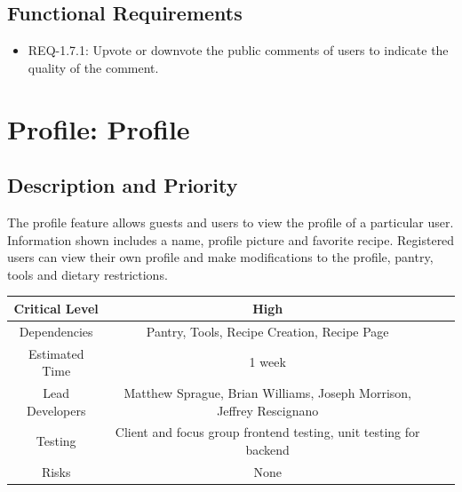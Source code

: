 \documentclass{scrreprt}
\begin{document}
\subsection{\gls{Functional Requirements}}

\begin{itemize}
    \item REQ-1.7.1: Upvote or downvote the public comments of users to indicate the quality of the comment.
\end{itemize}

\section{Profile: Profile}

\subsection{Description and Priority}

The profile feature allows guests and users to view the profile of a particular user. Information shown includes a name, profile picture and favorite recipe. Registered users can view their own profile and make modifications to the profile, pantry, tools and dietary restrictions.

\begin{center}
    \begin{tabular}{| c | c | c | c |}
        \hline
        Critical Level  & High                                                                 \\
        \hline
        Dependencies    & Pantry, Tools, Recipe Creation, Recipe Page                          \\
        \hline
        Estimated Time  & 1 week                                                               \\
        \hline
        Lead Developers & Matthew Sprague, Brian Williams, Joseph Morrison, Jeffrey Rescignano \\
        \hline
        Testing         & Client and focus group \gls{frontend} testing,
                          \gls{unit testing} for \gls{backend}                                 \\
        \hline
        Risks           & None                                                                 \\
        \hline
    \end{tabular}
\end{center}
\end{document}
